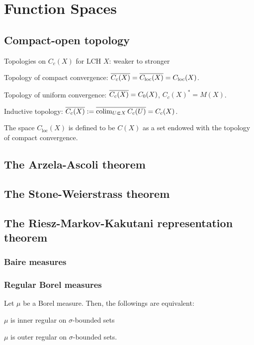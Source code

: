 \documentclass{../note}
\begin{document}
\part{Function Spaces}
\chapter{Compact-open topology}


Topologies on $C_c(X)$ for LCH $X$: weaker to stronger
\begin{parts}
\item Topology of compact convergence: $\overline{C_c(X)}=\overline{C_{\mathrm{loc}}(X)}=C_{\mathrm{loc}}(X)$.
\item Topology of uniform convergence: $\overline{C_c(X)}=C_0(X)$, $C_c(X)^*=M(X)$.
\item Inductive topology: $\overline{C_c(X)}:=\overline{\operatorname*{colim}_{U\Subset X}C_c(U)}=C_c(X)$.
\end{parts}
The space $C_{\mathrm{loc}}(X)$ is defined to be $C(X)$ as a set endowed with the topology of compact convergence.


\chapter{The Arzela-Ascoli theorem}
\chapter{The Stone-Weierstrass theorem}





\chapter{The Riesz-Markov-Kakutani representation theorem}
\section{Baire measures}

\section{Regular Borel measures}

\begin{thm}
Let $\mu$ be a Borel measure.
Then, the followings are equivalent:
\begin{parts}
\item$\mu$ is inner regular on $\sigma$-bounded sets
\item $\mu$ is outer regular on $\sigma$-bounded sets.
\end{parts}
\end{thm}
\end{document}
